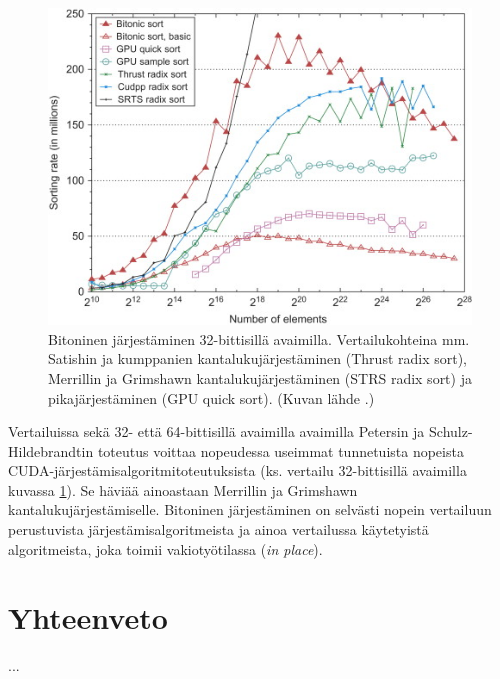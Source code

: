 \documentclass[a4paper,11pt]{article}
\newcommand{\engl}[1]{\foreignlanguage{english}{\em #1}}
\begin{document}
\begin{figure}
\centering
\includegraphics[scale = 1.0]{bitonic_32bit}
\caption{Bitoninen järjestäminen 32-bittisillä avaimilla. Vertailukohteina mm. Satishin ja kumppanien \cite{satish2009} kantalukujärjestäminen (Thrust radix sort), Merrillin ja Grimshawn kantalukujärjestäminen \cite{merrill2011} (STRS radix sort) ja pikajärjestäminen \cite{cederman2009} (GPU quick sort). (Kuvan lähde \cite{peters2012gems}.)}
\label{fig:bitonic_32bit}
\end{figure}

Vertailuissa sekä 32- että 64-bittisillä avaimilla avaimilla Petersin ja Schulz-Hildebrandtin toteutus voittaa nopeudessa useimmat tunnetuista nopeista CUDA-järjestämisalgoritmitoteutuksista (ks. vertailu 32-bittisillä avaimilla kuvassa \ref{fig:bitonic_32bit}). Se häviää ainoastaan Merrillin ja Grimshawn \cite{merrill2011} kantalukujärjestämiselle. Bitoninen järjestäminen on selvästi nopein vertailuun perustuvista järjestämisalgoritmeista ja ainoa vertailussa käytetyistä algoritmeista, joka toimii vakiotyötilassa (\engl{in place}).

\section{Yhteenveto}

...

\printbibliography
\end{document}
